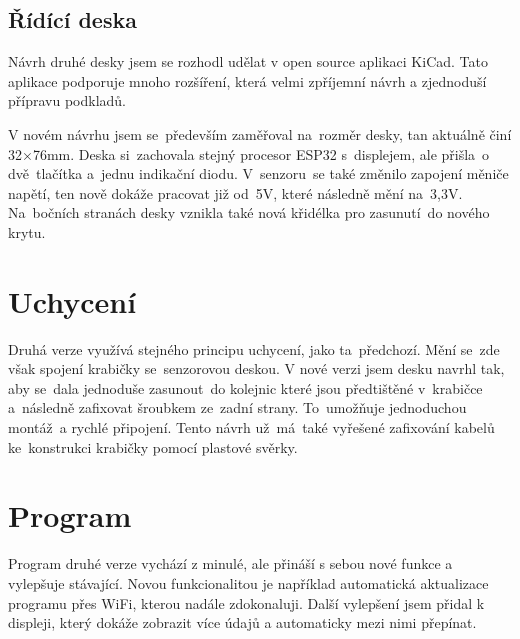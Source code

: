 \subsection{Řídící deska}
Návrh druhé desky jsem se rozhodl udělat v open source aplikaci KiCad.
Tato aplikace podporuje mnoho rozšíření, která velmi zpříjemní návrh a zjednoduší přípravu podkladů.

V novém návrhu jsem se~především zaměřoval na~rozměr desky, tan aktuálně činí 32$\times$76mm.
Deska si~zachovala stejný procesor ESP32 s~displejem, ale přišla~o dvě~tlačítka a~jednu indikační diodu.
V~senzoru~se také změnilo zapojení měniče napětí, ten nově dokáže pracovat již od~5V, které následně mění na~3,3V.
Na~bočních stranách desky vznikla také nová křidélka pro zasunutí~do nového krytu.

\fxnote[author=JA]{\textcolor{mygreen}{krabička popis, uchycení}}
\fxnote[author=JA]{\textcolor{mygreen}{Obrázek deksa => krabička}}

\section{Uchycení}
Druhá verze využívá stejného principu uchycení, jako ta~předchozí. 
Mění se~zde však spojení krabičky se~senzorovou deskou. 
V nové verzi jsem desku navrhl tak, aby se~dala jednoduše zasunout~do kolejnic které jsou předtištěné v~krabičce a~následně zafixovat šroubkem ze~zadní strany.
To~umožňuje jednoduchou montáž~a rychlé připojení.
Tento návrh už~má~také vyřešené zafixování kabelů ke~konstrukci krabičky pomocí plastové svěrky.


\section{Program}
Program druhé verze vychází z minulé, ale přináší s sebou nové funkce a vylepšuje stávající.
Novou funkcionalitou je například automatická aktualizace programu přes WiFi, kterou nadále zdokonaluji.
Další vylepšení jsem přidal k displeji, který dokáže zobrazit více údajů a automaticky mezi nimi přepínat.
\newpage